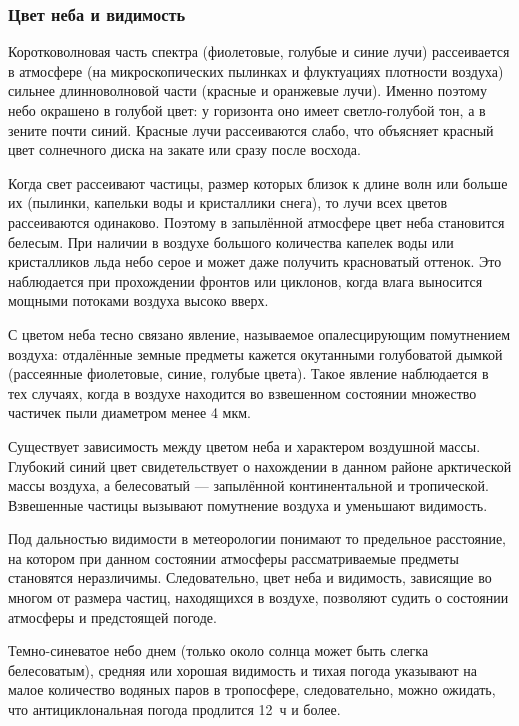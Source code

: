 \subsubsection{Цвет неба и видимость}

Коротковолновая часть спектра (фиолетовые, голубые и синие лучи)
рассеивается в атмосфере (на микроскопических пылинках и флуктуациях
плотности воздуха) сильнее длинноволновой части (красные и оранжевые
лучи). Именно поэтому небо окрашено в голубой цвет: у горизонта оно
имеет светло-голубой тон, а в зените почти синий. Красные лучи
рассеиваются слабо, что объясняет красный цвет солнечного диска на
закате или сразу после восхода.

Когда свет рассеивают частицы, размер которых близок к длине волн или
больше их (пылинки, капельки воды и кристаллики снега), то лучи всех
цветов рассеиваются одинаково. Поэтому в запылённой атмосфере цвет
неба становится белесым. При наличии в воздухе большого количества
капелек воды или кристалликов льда небо серое и может даже получить
красноватый оттенок. Это наблюдается при прохождении фронтов или
циклонов, когда влага выносится мощными потоками воздуха высоко вверх.

С цветом неба тесно связано явление, называемое опалесцирующим
помутнением воздуха: отдалённые земные предметы кажется окутанными
голубоватой дымкой (рассеянные фиолетовые, синие, голубые
цвета). Такое явление наблюдается в тех случаях, когда в воздухе
находится во взвешенном состоянии множество частичек пыли диаметром
менее 4 мкм.

Существует зависимость между цветом неба и характером воздушной
массы. Глубокий синий цвет свидетельствует о нахождении в данном
районе арктической массы воздуха, а белесоватый — запылённой
континентальной и тропической. Взвешенные частицы вызывают помутнение
воздуха и уменьшают видимость.

Под дальностью видимости в метеорологии понимают то предельное
расстояние, на котором при данном состоянии атмосферы рассматриваемые
предметы становятся неразличимы. Следовательно, цвет неба и видимость,
зависящие во многом от размера частиц, находящихся в воздухе,
позволяют судить о состоянии атмосферы и предстоящей погоде.

 Темно-синеватое небо днем (только около солнца может быть
слегка белесоватым), средняя или хорошая видимость и тихая погода
указывают на малое количество водяных паров в тропосфере,
следовательно, можно ожидать, что антициклональная погода продлится
12~ч и более.

